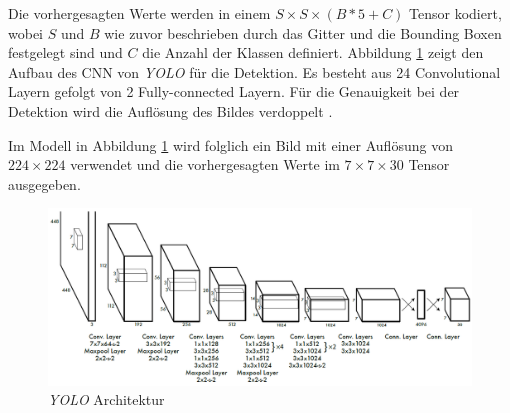 Die vorhergesagten Werte werden in einem $S \times S \times (B * 5 + C)$ Tensor kodiert, wobei $S$ und $B$ wie zuvor beschrieben durch das Gitter und die Bounding Boxen festgelegt sind und $C$ die Anzahl der Klassen definiert. Abbildung \ref{yolo_architecture} zeigt den Aufbau des CNN von \textit{YOLO} für die Detektion. Es besteht aus 24 Convolutional Layern gefolgt von 2 Fully-connected Layern. Für die Genauigkeit bei der Detektion wird die Auflösung des Bildes verdoppelt \cite{JosephRedmon.2016}. 

Im Modell in Abbildung \ref{yolo_architecture} wird folglich ein Bild mit einer Auflösung von $224 \times 224$ verwendet und die vorhergesagten Werte im $7 \times 7 \times 30$ Tensor ausgegeben. 

\begin{figure}[ht]
	\begin{center}
		\includegraphics[width=15cm]{Bilder/yolo_architecture.png} 
		\caption{\textit{YOLO} Architektur \cite{JosephRedmon.2016}}
		\label{yolo_architecture}
	\end{center}
\end{figure}






